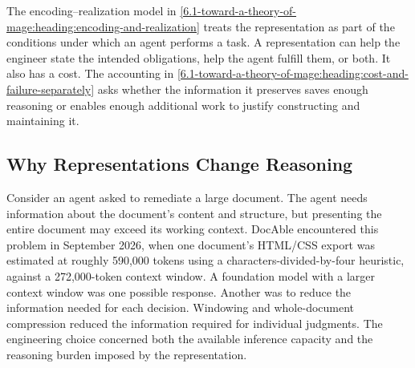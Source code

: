 The encoding–realization model in \autoref{6.1-toward-a-theory-of-mage:heading:encoding-and-realization} treats the representation as part of the conditions under which an agent performs a task. A representation can help the engineer state the intended obligations, help the agent fulfill them, or both. It also has a cost. The accounting in \autoref{6.1-toward-a-theory-of-mage:heading:cost-and-failure-separately} asks whether the information it preserves saves enough reasoning or enables enough additional work to justify constructing and maintaining it.

\subsection{Why Representations Change Reasoning}\label{heading:why-representations-change-reasoning}



Consider an agent asked to remediate a large document. The agent needs information about the document's content and structure, but presenting the entire document may exceed its working context. DocAble encountered this problem in September 2026, when one document's HTML/CSS export was estimated at roughly 590,000 tokens using a characters-divided-by-four heuristic, against a 272,000-token context window. A foundation model with a larger context window was one possible response. Another was to reduce the information needed for each decision. Windowing and whole-document compression reduced the information required for individual judgments. The engineering choice concerned both the available inference capacity and the reasoning burden imposed by the representation.


